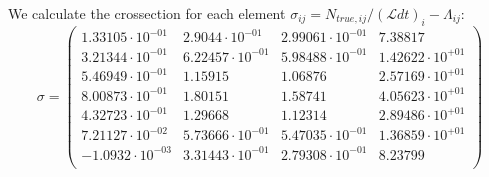 \documentclass[]{article}
\begin{document}
We calculate the crossection for each element $\sigma_{ij} = N_{true,ij}/(\mathcal{L}dt)_i-\Lambda_{ij}$:
\begin{equation}
\sigma = \begin{pmatrix}
   1.33105\cdot 10^{-01} & 2.9044\cdot 10^{-01} & 2.99061\cdot 10^{-01} & 7.38817 \\
   3.21344\cdot 10^{-01} & 6.22457\cdot 10^{-01} & 5.98488\cdot 10^{-01} & 1.42622\cdot 10^{+01} \\
   5.46949\cdot 10^{-01} & 1.15915 & 1.06876 & 2.57169\cdot 10^{+01} \\
   8.00873\cdot 10^{-01} & 1.80151 & 1.58741 & 4.05623\cdot 10^{+01} \\
   4.32723\cdot 10^{-01} & 1.29668 & 1.12314 & 2.89486\cdot 10^{+01} \\
   7.21127\cdot 10^{-02} & 5.73666\cdot 10^{-01} & 5.47035\cdot 10^{-01} & 1.36859\cdot 10^{+01} \\
   -1.0932\cdot 10^{-03} & 3.31443\cdot 10^{-01} & 2.79308\cdot 10^{-01} & 8.23799 \\
\end{pmatrix}
\end{equation}
\end{document}
